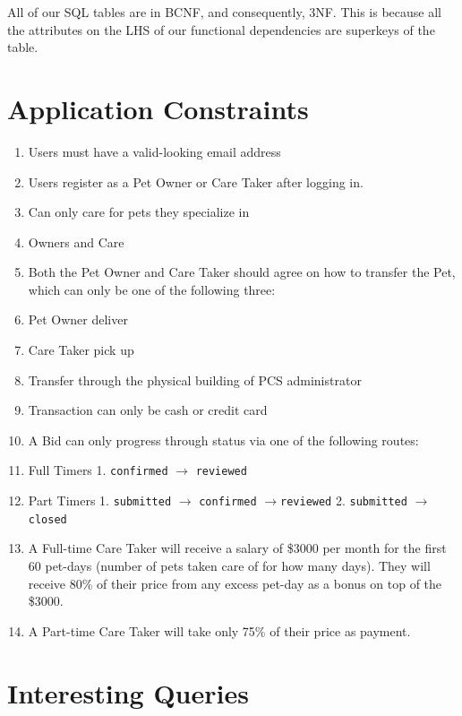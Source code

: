 \documentclass[
  paper=a4,
  ,captions=tableheading
]{scrartcl}
\newcommand{\passthrough}[1]{#1}
\providecommand{\tightlist}{%
  \setlength{\itemsep}{0pt}\setlength{\parskip}{0pt}}
\begin{document}
All of our SQL tables are in BCNF, and consequently, 3NF. This is
because all the attributes on the LHS of our functional dependencies are
superkeys of the table.

\hypertarget{application-constraints}{%
\section{Application Constraints}\label{application-constraints}}

\begin{enumerate}
\def\labelenumi{\arabic{enumi}.}
\tightlist
\item
  Users must have a valid-looking email address
\item
  Users register as a Pet Owner or Care Taker after logging in.
\item
  Can only care for pets they specialize in
\item
  Owners and Care
\item
  Both the Pet Owner and Care Taker should agree on how to transfer the
  Pet, which can only be one of the following three:
\item
  Pet Owner deliver
\item
  Care Taker pick up
\item
  Transfer through the physical building of PCS administrator
\item
  Transaction can only be cash or credit card
\item
  A Bid can only progress through status via one of the following
  routes:
\item
  Full Timers 1. \passthrough{\lstinline!confirmed!} \(\rightarrow\)
  \passthrough{\lstinline!reviewed!}
\item
  Part Timers 1. \passthrough{\lstinline!submitted!} \(\rightarrow\)
  \passthrough{\lstinline!confirmed!}
  \(\rightarrow\)\passthrough{\lstinline!reviewed!} 2.
  \passthrough{\lstinline!submitted!} \(\rightarrow\)
  \passthrough{\lstinline!closed!}
\item
  A Full-time Care Taker will receive a salary of \$3000 per month for
  the first 60 pet-days (number of pets taken care of for how many
  days). They will receive 80\% of their price from any excess pet-day
  as a bonus on top of the \$3000.
\item
  A Part-time Care Taker will take only 75\% of their price as payment.
\end{enumerate}

\hypertarget{interesting-queries}{%
\section{Interesting Queries}\label{interesting-queries}}
\end{document}
